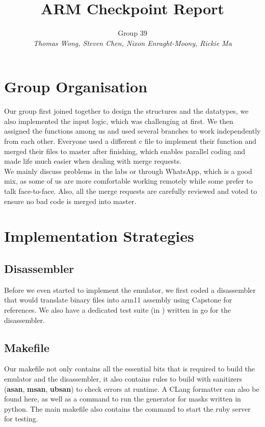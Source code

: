 \documentclass[11pt]{article}
\begin{document}
\title{\vspace{-2cm}ARM Checkpoint Report}
\author{Group 39\\ \small \textit{Thomas Wong, Steven Chen, Nixon Enraght-Moony, Rickie Ma}}

\maketitle

\section{Group Organisation}

Our group first joined together to design the structures and the datatypes, we also implemented the input logic, which was challenging at first. We then assigned the functions among us and used several branches to work independently from each other. Everyone used a different c file to implement their function and merged their files to master after finishing, which enables parallel coding and made life much easier when dealing with merge requests.\\

We mainly discuss problems in the labs or through WhatsApp, which is a good mix, as some of us are more comfortable working remotely while some prefer to talk face-to-face. Also, all the merge requests are carefully reviewed and voted to ensure no bad code is merged into master. 

\section{Implementation Strategies}

\subsection{Disassembler}
Before we even started to implement the emulator, we first coded a disassembler that would translate binary files into arm11 assembly using Capstone for references. We also have a dedicated test suite (in ) written in go for the disassembler.

\subsection{Makefile}
Our makefile  not only contains all the essential bits that is required to build the emulator and the disassembler, it also contains rules to build with sanitizers (\textbf{asan}, \textbf{msan}, \textbf{ubsan}) to check errors at runtime. A CLang formatter can also be found here, as well as a command to run the generator for masks written in python. The main makefile  also contains the command to start the ruby server for testing.
\end{document}
